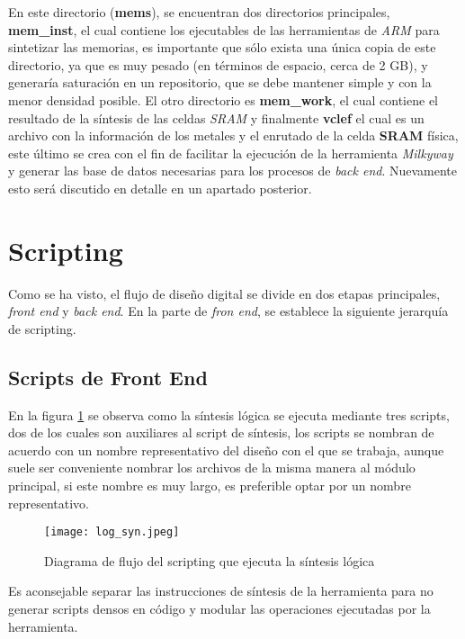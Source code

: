 En este directorio (\textbf{mems}), se encuentran dos directorios principales, \textbf{mem\_inst}, el cual contiene los ejecutables de las herramientas de \textit{ARM} para sintetizar las memorias, es importante que sólo exista una única copia de este directorio, ya que es muy pesado (en términos de espacio, cerca de 2 GB), y generaría saturación en un repositorio, que se debe mantener simple y con la menor densidad posible. El otro directorio es \textbf{mem\_work}, el cual contiene el resultado de la síntesis de las celdas \textit{SRAM} y finalmente \textbf{vclef} el cual es un archivo con la información de los metales y el enrutado de la celda \textbf{SRAM} física, este último se crea con el fin de facilitar la ejecución de la herramienta \textit{Milkyway} y generar las base de datos necesarias para los procesos de \textit{back end}. Nuevamente esto será discutido en detalle en un apartado posterior.

\section{Scripting}

Como se ha visto, el flujo de diseño digital se divide en dos etapas principales, \textit{front end} y \textit{back end}. En la parte de \textit{fron end}, se establece la siguiente jerarquía de scripting.

\subsection{Scripts de Front End}

En la figura \ref{s_syn} se observa como la síntesis lógica se ejecuta mediante tres scripts, dos de los cuales son auxiliares al script de síntesis, los scripts se nombran de acuerdo con un nombre representativo del diseño con el que se trabaja, aunque suele ser conveniente nombrar los archivos de la misma manera al módulo principal, si este nombre es muy largo, es preferible optar por un nombre representativo.

\begin{figure}[h]
\texttt{[image: log\_syn.jpeg]}
\centering
\caption{Diagrama de flujo del scripting que ejecuta la síntesis lógica}
\label{s_syn}
\end{figure}



Es aconsejable separar las instrucciones de síntesis de la herramienta para no generar scripts densos en código y modular las operaciones ejecutadas por la herramienta.

